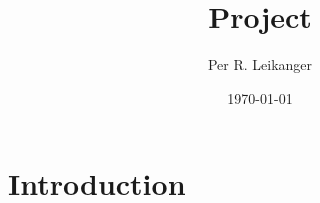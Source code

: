 \documentclass[a4paper,11 pt]{article}
\author{Per R. Leikanger}
\title{Project}
\date{\today}
\begin{document}
   

\maketitle

\section{Introduction}






\newpage








%

\end{document}
